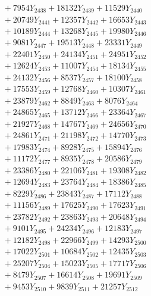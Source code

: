 \documentclass[a4paper,10pt]{article}
\begin{document}
{\begin{align}
&\;  + 7954 Y_{2438} + 18132 Y_{2439} + 11529 Y_{2440} \\[0.3ex]
&\;  + 20749 Y_{2441} + 12357 Y_{2442} + 16653 Y_{2443} \\[0.3ex]
&\;  + 10189 Y_{2444} + 13268 Y_{2445} + 19980 Y_{2446} \\[0.3ex]
&\;  + 9081 Y_{2447} + 19513 Y_{2448} + 23331 Y_{2449} \\[0.3ex]
&\;  + 22401 Y_{2450} + 24134 Y_{2451} + 24951 Y_{2452} \\[0.3ex]
&\;  + 12624 Y_{2453} + 11007 Y_{2454} + 18134 Y_{2455} \\[0.3ex]
&\;  + 24132 Y_{2456} + 8537 Y_{2457} + 18100 Y_{2458} \\[0.5ex]\allowbreak
&\;  + 17553 Y_{2459} + 12768 Y_{2460} + 10307 Y_{2461} \\[0.3ex]
&\;  + 23879 Y_{2462} + 8849 Y_{2463} + 8076 Y_{2464} \\[0.3ex]
&\;  + 24865 Y_{2465} + 13712 Y_{2466} + 23364 Y_{2467} \\[0.3ex]
&\;  + 21927 Y_{2468} + 14767 Y_{2469} + 24656 Y_{2470} \\[0.3ex]
&\;  + 24861 Y_{2471} + 21198 Y_{2472} + 14770 Y_{2473} \\[0.3ex]
&\;  + 17983 Y_{2474} + 8928 Y_{2475} + 15894 Y_{2476} \\[0.3ex]
&\;  + 11172 Y_{2477} + 8935 Y_{2478} + 20586 Y_{2479} \\[0.3ex]
&\;  + 23386 Y_{2480} + 22106 Y_{2481} + 19308 Y_{2482} \\[0.3ex]
&\;  + 12694 Y_{2483} + 23764 Y_{2484} + 18386 Y_{2485} \\[0.3ex]
&\;  + 8229 Y_{2486} + 23843 Y_{2487} + 17112 Y_{2488} \\[0.5ex]\allowbreak
&\;  + 11156 Y_{2489} + 17625 Y_{2490} + 17623 Y_{2491} \\[0.3ex]
&\;  + 23782 Y_{2492} + 23863 Y_{2493} + 20648 Y_{2494} \\[0.3ex]
&\;  + 9101 Y_{2495} + 24234 Y_{2496} + 12183 Y_{2497} \\[0.3ex]
&\;  + 12182 Y_{2498} + 22966 Y_{2499} + 14293 Y_{2500} \\[0.3ex]
&\;  + 17022 Y_{2501} + 10684 Y_{2502} + 12435 Y_{2503} \\[0.3ex]
&\;  + 25207 Y_{2504} + 15023 Y_{2505} + 17717 Y_{2506} \\[0.3ex]
&\;  + 8479 Y_{2507} + 16614 Y_{2508} + 19691 Y_{2509} \\[0.3ex]
&\;  + 9453 Y_{2510} + 9839 Y_{2511} + 21257 Y_{2512} \\[0.3ex]

\end{align}}
\end{document}
